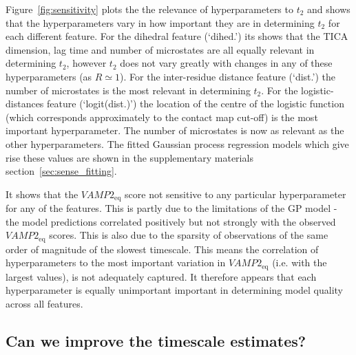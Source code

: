 \documentclass[journal=jacsat,manuscript=article]{achemso}
\begin{document}
Figure~\ref{fig:sensitivity} plots the  the relevance of hyperparameters to $t_{2}$ and shows that the hyperparameters vary in how important they are in determining $t_2$ for each different feature.  For the dihedral feature (`dihed.') its shows that the TICA dimension, lag time and number of microstates are all equally relevant in determining $t_2$, however $t_2$ does not vary greatly with changes in any of these hyperparameters (as $R\simeq 1$). For the inter-residue distance feature (`dist.') the number of microstates is the most relevant in determining $t_2$. For the logistic-distances feature (`logit(dist.)') the location of the centre of the logistic function (which corresponds approximately to the contact map cut-off) is the most important hyperparameter.  The number of microstates is now as relevant as the other hyperparameters. The fitted Gaussian process regression models which give rise these values are shown in the supplementary materials section~\ref{sec:sense_fitting}. 


It shows that the $VAMP2_{\mathrm{eq}}$ score not sensitive to any particular hyperparameter for any of the features.  This is partly due to the limitations of the GP model - the model predictions correlated positively but not strongly with the observed $VAMP2_{\mathrm{eq}}$ scores. This is also due to the sparsity of observations of the same order of magnitude of the slowest timescale.  This means the correlation of hyperparameters to the most important variation in $VAMP2_{\mathrm{eq}}$ (i.e. with the largest values), is not adequately captured. It therefore appears that each hyperparameter is equally unimportant important in determining model quality across all features. 


\subsection{Can we improve the timescale estimates?}
\end{document}
